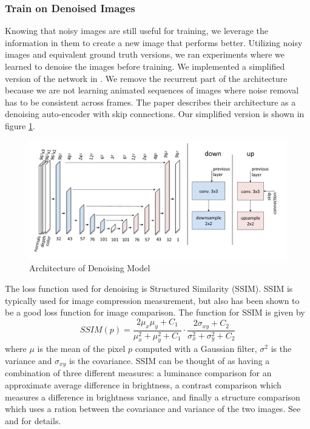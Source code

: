 \documentclass[10pt,twocolumn,letterpaper]{article}
\begin{document}
\subsubsection{Train on Denoised Images} \label{denoising}
Knowing that noisy images are still useful for training, we leverage the information in them to create a new image that performs better. Utilizing noisy images and equivalent ground truth versions, we ran experiments where we learned to denoise the images before training.  We implemented a simplified version of the network in \cite{Chaitanya:2017:IRM:3072959.3073601}.  We remove the recurrent part of the architecture because we are not learning animated sequences of images where noise removal has to be consistent across frames. The paper describes their architecture as a denoising auto-encoder with skip connections.  Our simplified version is shown in figure \ref{fig:denoise}. 
\begin{figure}[h!]
\centering
\includegraphics[width=1.0\columnwidth]{./assets/denoiser_diagram.pdf}
\caption{Architecture of Denoising Model}
\label{fig:denoise}
\end{figure}

The loss function used for denoising is Structured Similarity (SSIM)\cite{Wang04imagequality}. SSIM is typically used for image compression measurement, but also has been shown to be a good loss function for image comparison. The function for SSIM is given by
$$SSIM(p)=\frac{2\mu_x\mu_y + C_1}{\mu_x^2+\mu_y^2+C_1}\cdot\frac{2\sigma_{xy}+C_2}{\sigma_x^2+\sigma_y^2+C_2}$$
where $\mu$ is the mean of the pixel $p$ computed with a Gaussian filter, $\sigma^2$ is the variance and $\sigma_{xy}$ is the covariance. SSIM can be thought of as having a combination of three different measures: a luminance comparison for an approximate average difference in brightness,  a contrast comparison which measures a difference in brightness variance, and finally a structure comparison which uses a ration between the covariance and variance of the two images.  See \cite{DBLP:journals/corr/ZhangSYSLJF16} and \cite{DBLP:journals/corr/ZhaoGFK15} for details.\\
\end{document}
